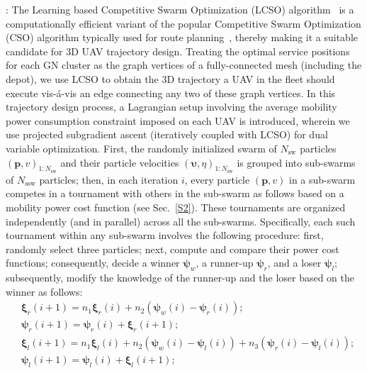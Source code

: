 \documentclass[10pt, twocolumn]{IEEEtran}
\begin{document}
: The Learning based Competitive Swarm Optimization (LCSO) algorithm~\cite{LCSO} is a computationally efficient variant of the popular Competitive Swarm Optimization (CSO) algorithm typically used for route planning~\cite{MAESTRO_TCCN}, thereby making it a suitable candidate for $3$D UAV trajectory design. Treating the optimal service positions for each GN cluster as the graph vertices of a fully-connected mesh (including the depot), we use LCSO to obtain the $3$D trajectory a UAV in the fleet should execute vis-\'{a}-vis an edge connecting any two of these graph vertices. In this trajectory design process, a Lagrangian setup involving the average mobility power consumption constraint imposed on each UAV is introduced, wherein we use projected subgradient ascent (iteratively coupled with LCSO) for dual variable optimization. First, the randomly initialized swarm of $N_{\mathrm{sw}}$ particles $(\mathbf{p},v)_{1:N_{\mathrm{sw}}}$ and their particle velocities $(\boldsymbol{\upsilon},\eta)_{1:N_{\mathrm{sw}}}$ is grouped into sub-swarms of $N_{\mathrm{ssw}}$ particles; then, in each iteration $i$, every particle $(\mathbf{p}, v)$ in a sub-swarm competes in a tournament with others in the sub-swarm as follows based on a mobility power cost function (see Sec.~\ref{S2}). These tournaments are organized independently (and in parallel) across all the sub-swarms. Specifically, each such tournament within any sub-swarm involves the following procedure: first, randomly select three particles; next, compute and compare their power cost functions; consequently, decide a winner $\boldsymbol{\psi}_{w}$, a runner-up $\boldsymbol{\psi}_{r}$, and a loser $\boldsymbol{\psi}_{l}$; subsequently, modify the knowledge of the runner-up and the loser based on the winner as follows:
\vspace{0.405mm}
\begin{align}\label{LCSO}
    &\boldsymbol{\xi}_{r}(i + 1) = n_{1}\boldsymbol{\xi}_{r}(i) + n_{2}\left(\boldsymbol{\psi}_{w}(i) - \boldsymbol{\psi}_{r}(i)\right);\nonumber\\
    &\boldsymbol{\psi}_{r}(i + 1) = \boldsymbol{\psi}_{r}(i) + \boldsymbol{\xi}_{r}(i + 1);\nonumber\\
    &\boldsymbol{\xi}_{l}(i{+}1){=}n_{1}\boldsymbol{\xi}_{l}(i){+}n_{2}\left(\boldsymbol{\psi}_{w}(i){-}\boldsymbol{\psi}_{l}(i)\right){+}n_{3}\left(\boldsymbol{\psi}_{r}(i){-}\boldsymbol{\psi}_{l}(i)\right);\nonumber\\
    &\boldsymbol{\psi}_{l}(i + 1) = \boldsymbol{\psi}_{l}(i) + \boldsymbol{\xi}_{l}(i + 1);
\end{align}
\end{document}
